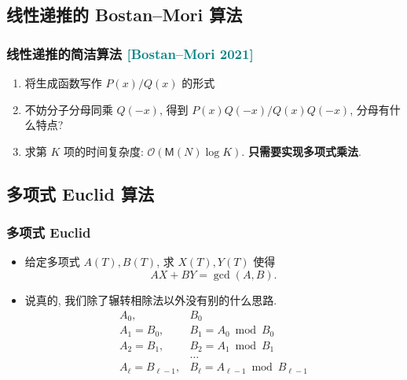 \documentclass{ctexbeamer}
\newcommand{\cnote}[2][\footnotesize]{\textcolor{teal}{#1[#2]}}
\newcommand{\bigO}{\mathcal O}
\begin{document}
\subsection{线性递推的 Bostan--Mori 算法}
\begin{frame}
  \frametitle{线性递推的简洁算法 \cnote{Bostan--Mori 2021}}

  \begin{enumerate}
    \item<1-> 将生成函数写作 $P(x) / Q(x)$ 的形式
    \item<2-> 不妨分子分母同乘 $Q(-x)$, 得到 $P(x)Q(-x) / Q(x)Q(-x)$, 分母有什么特点?
    \item<3->  求第 $K$ 项的时间复杂度: $\bigO(\mathsf{M}(N)\log K)$. \textbf{只需要实现多项式乘法}.
  \end{enumerate}
\end{frame}

\subsection{多项式 Euclid 算法}

\begin{frame}
  \frametitle{多项式 Euclid}

  \begin{itemize}
    \item<1-> 给定多项式 $A(T), B(T)$, 求 $X(T), Y(T)$ 使得
    \begin{equation}
      AX + BY = \gcd(A, B).
    \end{equation}
    \item<2-> 说真的, 我们除了辗转相除法以外没有别的什么思路.
    \begin{align}
      A_0, & B_0\\
      A_1 = B_0, & B_1 = A_0 \bmod B_0\\
      A_2 = B_1, & B_2 = A_1 \bmod B_1\\
      & \dots \\
      A_\ell = B_{\ell - 1}, & B_\ell = A_{\ell - 1} \bmod B_{\ell - 1}
    \end{align}
  \end{itemize}

\end{frame}
\end{document}
